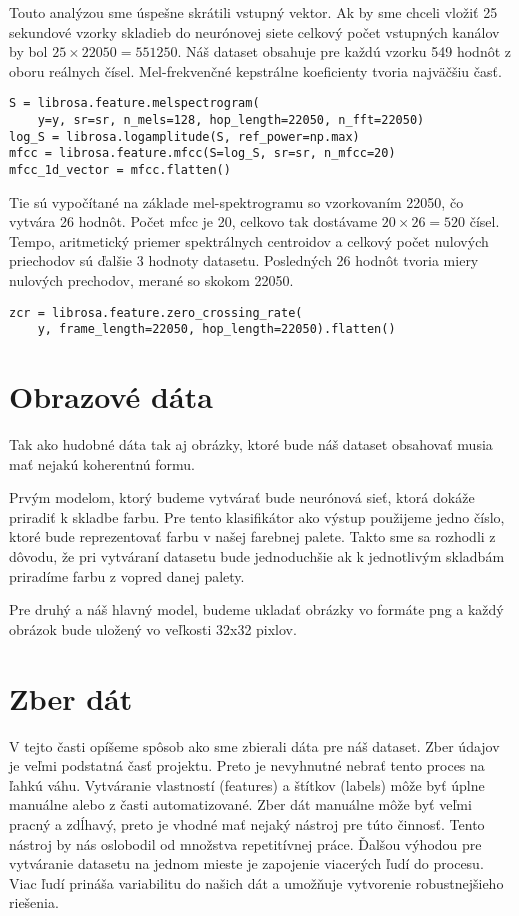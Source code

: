 Touto analýzou sme úspešne skrátili vstupný vektor.
Ak by sme chceli vložiť 25 sekundové vzorky skladieb do neurónovej siete celkový počet vstupných kanálov by bol \( 25 \times 22050 = 551250\).
Náš dataset obsahuje pre každú vzorku 549 hodnôt z oboru reálnych čísel.
Mel-frekvenčné kepstrálne koeficienty tvoria najväčšiu časť.
\begin{verbatim}
S = librosa.feature.melspectrogram(
	y=y, sr=sr, n_mels=128, hop_length=22050, n_fft=22050)
log_S = librosa.logamplitude(S, ref_power=np.max)
mfcc = librosa.feature.mfcc(S=log_S, sr=sr, n_mfcc=20)
mfcc_1d_vector = mfcc.flatten()
\end{verbatim}
Tie sú vypočítané na základe mel-spektrogramu so vzorkovaním 22050, čo vytvára 26 hodnôt.
Počet mfcc je 20, celkovo tak dostávame \( 20 \times 26 = 520\) čísel.
Tempo, aritmetický priemer spektrálnych centroidov a celkový počet nulových priechodov sú ďalšie 3 hodnoty datasetu.
Posledných 26 hodnôt tvoria miery nulových prechodov, merané so skokom 22050.
\begin{verbatim}
zcr = librosa.feature.zero_crossing_rate(
	y, frame_length=22050, hop_length=22050).flatten()
\end{verbatim}


\section{Obrazové dáta}
Tak ako hudobné dáta tak aj obrázky, ktoré bude náš dataset obsahovať musia mať nejakú koherentnú formu.

Prvým modelom, ktorý budeme vytvárať bude neurónová sieť, ktorá dokáže priradiť k skladbe farbu.
Pre tento klasifikátor ako výstup použijeme jedno číslo, ktoré bude reprezentovať farbu v našej farebnej palete.
Takto sme sa rozhodli z dôvodu, že pri vytváraní datasetu bude jednoduchšie ak k jednotlivým skladbám priradíme farbu z vopred danej palety.

Pre druhý a náš hlavný model, budeme ukladať obrázky vo formáte png a každý obrázok bude uložený vo veľkosti 32x32 pixlov.

\section{Zber dát}
V tejto časti opíšeme spôsob ako sme zbierali dáta pre náš dataset.
Zber údajov je veľmi podstatná časť projektu.
Preto je nevyhnutné nebrať tento proces na ľahkú váhu.
Vytváranie vlastností (features) a štítkov (labels) môže byť úplne manuálne alebo z časti automatizované.
Zber dát manuálne môže byť veľmi pracný a zdĺhavý, preto je vhodné mať nejaký nástroj pre túto činnosť.
Tento nástroj by nás oslobodil od množstva repetitívnej práce.
Ďalšou výhodou pre vytváranie datasetu na jednom mieste je zapojenie viacerých ľudí do procesu.
Viac ľudí prináša variabilitu do našich dát a umožňuje vytvorenie robustnejšieho riešenia.

